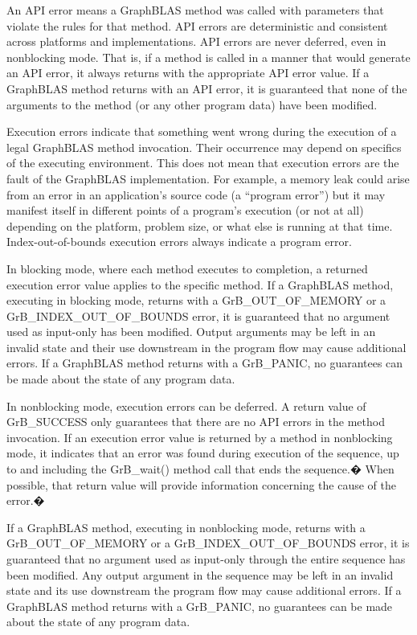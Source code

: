 An API error means a GraphBLAS method was called with parameters that
violate the rules for that method. API errors are deterministic and
consistent across platforms and implementations.  API errors are never
deferred, even in nonblocking mode. That is, if a method is called in a manner
that would generate an API error, it always returns with the appropriate API error value.  
If a GraphBLAS method returns with an API error, it is guaranteed that none of the
arguments to the method (or any other program data) have been modified.

Execution errors indicate that something went wrong during the execution
of a legal GraphBLAS method invocation.  Their occurrence may depend on
specifics of the executing environment.  This does not mean that execution
errors are the fault of the GraphBLAS implementation.  For example, a
memory leak could arise from an error in an application's source code (a 
``program error'') but it may manifest itself in different
points of a program's execution (or not at all) depending on the platform,
problem size, or what else is running at that time.  Index-out-of-bounds
execution errors always indicate a program error.

In blocking mode, where each method executes to completion, a returned
execution error value applies to the specific method.  If a GraphBLAS
method, executing in blocking mode, returns with a {\sf GrB\_OUT\_OF\_MEMORY} or
a {\sf GrB\_INDEX\_OUT\_OF\_BOUNDS} error, it is guaranteed that no argument
used as input-only has been modified. Output arguments may be left in
an invalid state and their use downstream in the program flow may cause
additional errors.  If a GraphBLAS method returns with a {\sf GrB\_PANIC},
no guarantees can be made about the state of any program data.

In nonblocking mode, execution errors can be deferred.  A return value
of {\sf GrB\_SUCCESS} only guarantees that there are no API errors in the
method invocation.  If an execution error value is returned by a method in
nonblocking mode, it indicates that an error was found during execution
of the sequence, up to and including the {\sf GrB\_wait()} method call
that ends the sequence.� When possible, that return value will provide
information concerning the cause of the error.� 

If a GraphBLAS method, executing in nonblocking mode, returns
with a {\sf GrB\_OUT\_OF\_MEMORY} or a {\sf GrB\_INDEX\_OUT\_OF\_BOUNDS} error,
it is guaranteed that no argument used as input-only through the entire
sequence has been modified. Any output argument in the sequence may be
left in an invalid state and its use downstream the program flow may cause
additional errors.  If a GraphBLAS method returns with a {\sf GrB\_PANIC},
no guarantees can be made about the state of any program data.

